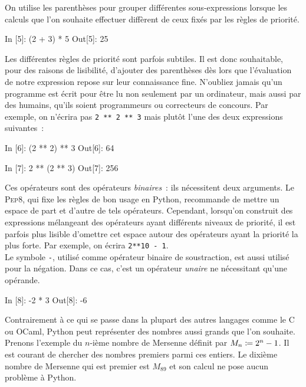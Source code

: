 \documentclass{magnolia}
\begin{document}
\noindent
On utilise les parenthèses pour grouper différentes sous-expressions lorsque les calculs
que l'on souhaite effectuer diffèrent de ceux fixés par les règles de priorité.

\begin{pythoncode}
In [5]: (2 + 3) * 5
Out[5]: 25 
\end{pythoncode}

\noindent
Les différentes règles de priorité sont parfois subtiles. Il est donc souhaitable, pour des raisons de lisibilité,
d'ajouter des parenthèses dès lors que l'évaluation de notre expression repose sur leur
connaissance fine. N'oubliez jamais qu'un programme est écrit pour être lu non seulement par
un ordinateur, mais aussi par des humains, qu'ils soient programmeurs ou correcteurs de
concours. Par exemple, on n'écrira pas \verb_2 ** 2 ** 3_ mais plutôt l'une
des deux expressions suivantes~:

\begin{pythoncode}
In [6]: (2 ** 2) ** 3
Out[6]: 64

In [7]: 2 ** (2 ** 3)
Out[7]: 256
\end{pythoncode}

\noindent 
Ces opérateurs sont des opérateurs \emph{binaires}~: ils nécessitent deux arguments.
Le \textsc{Pep8}, qui fixe les règles de bon usage
en Python, recommande de mettre un espace de part et d'autre de tels opérateurs.
Cependant, lorsqu'on construit des expressions mélangeant des opérateurs ayant
différents niveaux de priorité, il est parfois plus lisible d'omettre cet espace autour des
opérateurs ayant la priorité la plus forte. Par exemple, on écrira \verb!2**10 - 1!.\\

Le symbole \og\verb_-_\fg, utilisé comme opérateur
binaire de soustraction, est aussi utilisé pour la négation. Dans ce cas, c'est
un opérateur \emph{unaire} ne nécessitant qu'une opérande.

\begin{pythoncode}
In [8]: -2 * 3
Out[8]: -6
\end{pythoncode}
\noindent
Contrairement à ce qui se passe dans la plupart des autres langages comme le \textsc{C} ou
OCaml, Python peut représenter des nombres aussi grands que l'on souhaite.
Prenons l'exemple du $n$-ième nombre de Mersenne définit par
$M_n\coloneqq 2^n-1$. Il est courant de chercher des nombres premiers parmi ces entiers. Le
dixième nombre de Mersenne qui est premier est $M_{89}$ et son calcul ne pose aucun
problème à Python.
\end{document}
